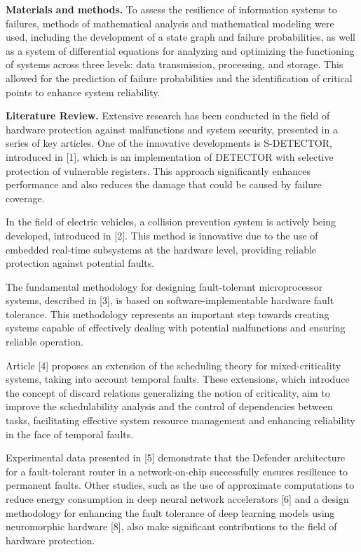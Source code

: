 \begin{multicols}{2}
{\bfseries Materials and methods.} To assess the resilience of information
systems to failures, methods of mathematical analysis and mathematical
modeling were used, including the development of a state graph and
failure probabilities, as well as a system of differential equations for
analyzing and optimizing the functioning of systems across three levels:
data transmission, processing, and storage. This allowed for the
prediction of failure probabilities and the identification of critical
points to enhance system reliability.

{\bfseries Literature Review.} Extensive research has been conducted in the
field of hardware protection against malfunctions and system security,
presented in a series of key articles. One of the innovative
developments is S-DETECTOR, introduced in {[}1{]}, which is an
implementation of DETECTOR with selective protection of vulnerable
registers. This approach significantly enhances performance and also
reduces the damage that could be caused by failure coverage.

In the field of electric vehicles, a collision prevention system is
actively being developed, introduced in {[}2{]}. This method is
innovative due to the use of embedded real-time subsystems at the
hardware level, providing reliable protection against potential faults.

The fundamental methodology for designing fault-tolerant microprocessor
systems, described in {[}3{]}, is based on software-implementable
hardware fault tolerance. This methodology represents an important step
towards creating systems capable of effectively dealing with potential
malfunctions and ensuring reliable operation.

Article {[}4{]} proposes an extension of the scheduling theory for
mixed-criticality systems, taking into account temporal faults. These
extensions, which introduce the concept of discard relations
generalizing the notion of criticality, aim to improve the
schedulability analysis and the control of dependencies between tasks,
facilitating effective system resource management and enhancing
reliability in the face of temporal faults.

Experimental data presented in {[}5{]} demonstrate that the Defender
architecture for a fault-tolerant router in a network-on-chip
successfully ensures resilience to permanent faults. Other studies, such
as the use of approximate computations to reduce energy consumption in
deep neural network accelerators {[}6{]} and a design methodology for
enhancing the fault tolerance of deep learning models using neuromorphic
hardware {[}8{]}, also make significant contributions to the field of
hardware protection.


\end{multicols}
